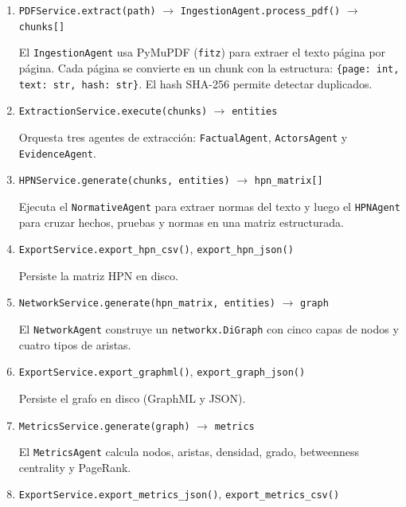 \documentclass[12pt, letterpaper]{article}
\begin{document}
\begin{enumerate}[nosep]
  \item \texttt{PDFService.extract(path)} $\rightarrow$
    \texttt{IngestionAgent.process\_pdf()} $\rightarrow$ \texttt{chunks[]}

    El \texttt{IngestionAgent} usa PyMuPDF (\texttt{fitz}) para
    extraer el texto página por página. Cada página se convierte en
    un chunk con la estructura:
    \texttt{\{page: int, text: str, hash: str\}}. El hash SHA-256
    permite detectar duplicados.

  \item \texttt{ExtractionService.execute(chunks)} $\rightarrow$
    \texttt{entities}

    Orquesta tres agentes de extracción:
    \texttt{FactualAgent}, \texttt{ActorsAgent} y
    \texttt{EvidenceAgent}.

  \item \texttt{HPNService.generate(chunks, entities)} $\rightarrow$
    \texttt{hpn\_matrix[]}

    Ejecuta el \texttt{NormativeAgent} para extraer normas del texto
    y luego el \texttt{HPNAgent} para cruzar hechos, pruebas y normas
    en una matriz estructurada.

  \item \texttt{ExportService.export\_hpn\_csv()},
    \texttt{export\_hpn\_json()}

    Persiste la matriz HPN en disco.

  \item \texttt{NetworkService.generate(hpn\_matrix, entities)}
    $\rightarrow$ \texttt{graph}

    El \texttt{NetworkAgent} construye un \texttt{networkx.DiGraph}
    con cinco capas de nodos y cuatro tipos de aristas.

  \item \texttt{ExportService.export\_graphml()},
    \texttt{export\_graph\_json()}

    Persiste el grafo en disco (GraphML y JSON).

  \item \texttt{MetricsService.generate(graph)} $\rightarrow$
    \texttt{metrics}

    El \texttt{MetricsAgent} calcula nodos, aristas, densidad,
    grado, betweenness centrality y PageRank.

  \item \texttt{ExportService.export\_metrics\_json()},
    \texttt{export\_metrics\_csv()}


\end{enumerate}
\end{document}
